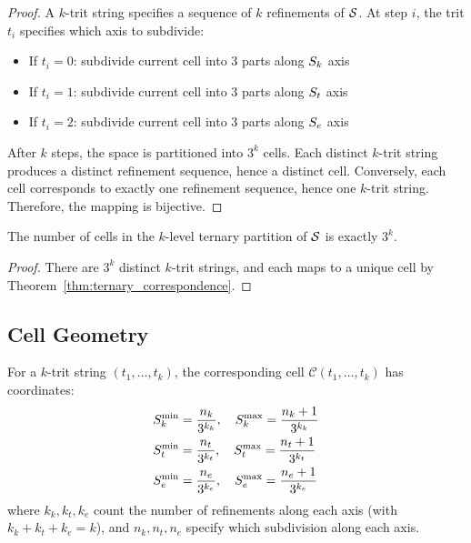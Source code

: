\begin{proof}
A $k$-trit string specifies a sequence of $k$ refinements of $\mathcal{S}$. At step $i$, the trit $t_i$ specifies which axis to subdivide:
\begin{itemize}
\item If $t_i = 0$: subdivide current cell into 3 parts along $S_k$ axis
\item If $t_i = 1$: subdivide current cell into 3 parts along $S_t$ axis  
\item If $t_i = 2$: subdivide current cell into 3 parts along $S_e$ axis
\end{itemize}

After $k$ steps, the space is partitioned into $3^k$ cells. Each distinct $k$-trit string produces a distinct refinement sequence, hence a distinct cell. Conversely, each cell corresponds to exactly one refinement sequence, hence one $k$-trit string. Therefore, the mapping is bijective.
\end{proof}

\begin{corollary}
\label{cor:cell_count}
The number of cells in the $k$-level ternary partition of $\mathcal{S}$ is exactly $3^k$.
\end{corollary}

\begin{proof}
There are $3^k$ distinct $k$-trit strings, and each maps to a unique cell by Theorem~\ref{thm:ternary_correspondence}.
\end{proof}

\subsection{Cell Geometry}

\begin{definition}
\label{def:cell_coordinates}
For a $k$-trit string $(t_1,\ldots,t_k)$, the corresponding cell $\mathcal{C}(t_1,\ldots,t_k)$ has coordinates:
\begin{align}
S_k^{\min} &= \frac{n_k}{3^{k_k}}, \quad S_k^{\max} = \frac{n_k+1}{3^{k_k}} \label{eq:Sk_cell} \\
S_t^{\min} &= \frac{n_t}{3^{k_t}}, \quad S_t^{\max} = \frac{n_t+1}{3^{k_t}} \label{eq:St_cell} \\
S_e^{\min} &= \frac{n_e}{3^{k_e}}, \quad S_e^{\max} = \frac{n_e+1}{3^{k_e}} \label{eq:Se_cell}
\end{align}
where $k_k, k_t, k_e$ count the number of refinements along each axis (with $k_k + k_t + k_e = k$), and $n_k, n_t, n_e$ specify which subdivision along each axis.
\end{definition}


